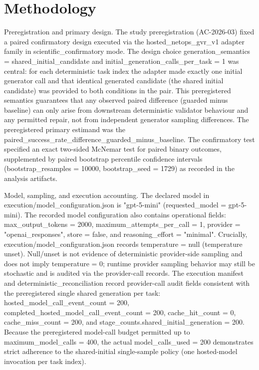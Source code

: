 \documentclass[conference]{IEEEtran}
\begin{document}
\section{Methodology}
Preregistration and primary design. The study preregistration (AC-2026-03) fixed a paired confirmatory design executed via the hosted\_netops\_gvr\_v1 adapter family in scientific\_confirmatory mode. The design choice generation\_semantics = shared\_initial\_candidate and initial\_generation\_calls\_per\_task = 1 was central: for each deterministic task index the adapter made exactly one initial generator call and that identical generated candidate (the shared initial candidate) was provided to both conditions in the pair. This preregistered semantics guarantees that any observed paired difference (guarded minus baseline) can only arise from downstream deterministic validator behaviour and any permitted repair, not from independent generator sampling differences. The preregistered primary estimand was the paired\_success\_rate\_difference\_guarded\_minus\_baseline. The confirmatory test specified an exact two-sided McNemar test for paired binary outcomes, supplemented by paired bootstrap percentile confidence intervals (bootstrap\_resamples = 10000, bootstrap\_seed = 1729) as recorded in the analysis artifacts.

Model, sampling, and execution accounting. The declared model in execution/model\_configuration.json is "gpt-5-mini" (requested\_model = gpt-5-mini). The recorded model configuration also contains operational fields: max\_output\_tokens = 2000, maximum\_attempts\_per\_call = 1, provider = "openai\_responses", store = false, and reasoning\_effort = "minimal". Crucially, execution/model\_configuration.json records temperature = null (temperature unset). Null/unset is not evidence of deterministic provider-side sampling and does not imply temperature = 0; runtime provider sampling behavior may still be stochastic and is audited via the provider-call records. The execution manifest and deterministic\_reconciliation record provider-call audit fields consistent with the preregistered single shared generation per task: hosted\_model\_call\_event\_count = 200, completed\_hosted\_model\_call\_event\_count = 200, cache\_hit\_count = 0, cache\_miss\_count = 200, and stage\_counts.shared\_initial\_generation = 200. Because the preregistered model-call budget permitted up to maximum\_model\_calls = 400, the actual model\_calls\_used = 200 demonstrates strict adherence to the shared-initial single-sample policy (one hosted-model invocation per task index).
\end{document}
